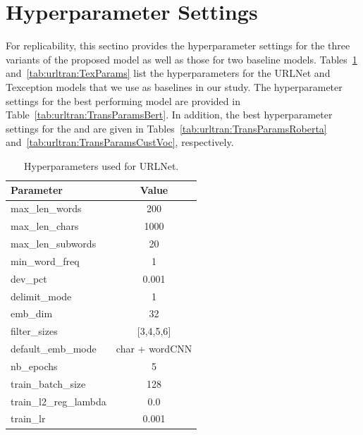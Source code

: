 \section{Hyperparameter Settings}
\label{sec:urltran:hyper}
For replicability, this sectino provides the hyperparameter settings for the three variants of the proposed \URLTranSys model as well as those for two baseline models.
Tables~\ref{tab:urltran:URLNetParams} and~\ref{tab:urltran:TexParams} list the hyperparameters for the URLNet and Texception models that we use
as baselines in our study. The hyperparameter settings for the best performing \URLTranSysb model are provided in Table~\ref{tab:urltran:TransParamsBert}.
In addition, the best hyperparameter settings for the \URLTranSysr and \URLTranSysc are given in Tables~\ref{tab:urltran:TransParamsRoberta} and~\ref{tab:urltran:TransParamsCustVoc},
respectively.

\begin{table}
\centering
\footnotesize
\begin{tabular}{lc}
\toprule
Parameter & Value \\
\midrule
max\_len\_words & 200 \\
max\_len\_chars & 1000 \\
max\_len\_subwords & 20 \\
min\_word\_freq & 1 \\
dev\_pct & 0.001 \\
delimit\_mode & 1 \\
emb\_dim & 32 \\
filter\_sizes & {[}3,4,5,6{]} \\
default\_emb\_mode & char + wordCNN \\
nb\_epochs & 5 \\
train\_batch\_size & 128 \\
train\_l2\_reg\_lambda & 0.0 \\
train\_lr & 0.001 \\
\bottomrule
\end{tabular}
\caption{Hyperparameters used for URLNet.}
\label{tab:urltran:URLNetParams}
\end{table}


